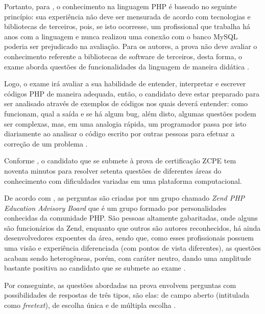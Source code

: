 Portanto, para , o
conhecimento na linguagem \acs{PHP} é baseado no seguinte princípio: sua
experiência não deve ser mensurada de acordo com tecnologias
e bibliotecas de terceiros, pois, se isto ocorresse, um profissional que
trabalha há anos com a linguagem e nunca realizou uma conexão com o banco
\acs{MySQL} poderia ser prejudicado na avaliação. Para os autores, a
prova não deve avaliar o conhecimento referente a bibliotecas de software
de terceiros, desta forma, o exame aborda questões de funcionalidades da
linguagem  de maneira didática \cite{theZendPHPCertificationPracticeTestBook}.

Logo, o exame irá avaliar a sua habilidade de
entender, interpretar e escrever códigos \acs{PHP} de maneira adequada, então,
o candidato deve estar preparado para ser analisado através de exemplos de
códigos nos quais deverá entender: como funcionam, qual a saída e se há algum \acs{bug},
além disto, algumas questões podem ser complexas, mas, em uma analogia rápida,
um programador passa por isto diariamente ao analisar o código escrito por
outras pessoas para efetuar a correção de um problema
\cite{theZendPHPCertificationPracticeTestBook}.

Conforme , o candidato que
se submete à prova de certificação \acs{ZCPE} tem noventa minutos para resolver
setenta questões de diferentes áreas do conhecimento com dificuldades variadas
em uma plataforma computacional.

De acordo com , as perguntas são criadas por
um grupo chamado \textit{Zend PHP Education Advisory Board} que é um grupo formado por
personalidades conhecidas da comunidade \acs{PHP}. São pessoas altamente
gabaritadas, onde alguns são funcionários da \acs{Zend}, enquanto que outros são autores
reconhecidos,  há ainda desenvolvedores expoentes da área, sendo que, como esses
profissionais possuem uma visão e experiência diferenciada (com pontos de
vista diferentes), as questões acabam sendo heterogêneas, porém, com caráter
neutro, dando uma amplitude bastante positiva ao candidato que se submete ao exame
\cite{entrevistaAriZCEBrasil}.

Por conseguinte, as questões abordadas na prova envolvem perguntas com
possibilidades de respostas de três tipos, são elas: de campo aberto (intitulada
como \textit{freetext}), de escolha única e de múltipla escolha
\cite{entrevistaAriZCEBrasil}.

